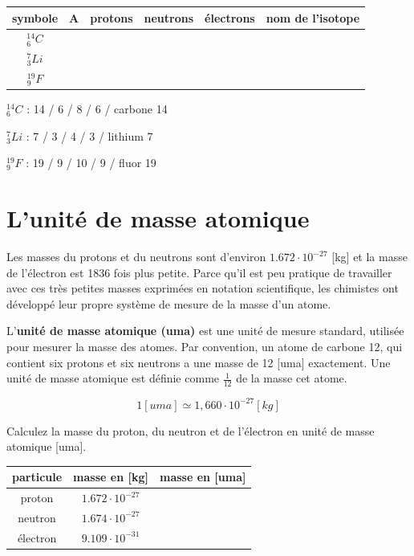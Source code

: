 \documentclass[
  11pt,
  french,
  a4paper,
  openany]{book}
\begin{document}
\begin{longtable}[]{@{}cccccc@{}}
\toprule
symbole & A & protons & neutrons & électrons & nom de l'isotope\tabularnewline
\midrule
\endhead
\(_{6}^{14}C\) & & & & &\tabularnewline
\(_{3}^{7}Li\) & & & & &\tabularnewline
\(_{9}^{19}F\) & & & & &\tabularnewline
\bottomrule
\end{longtable}

\begin{Answer}
\(_{6}^{14}C\) : 14 / 6 / 8 / 6 / carbone 14

\(_{3}^{7}Li\) : 7 / 3 / 4 / 3 / lithium 7

\(_{9}^{19}F\) : 19 / 9 / 10 / 9 / fluor 19

\end{Answer}

\hypertarget{lunituxe9-de-masse-atomique}{%
\section{L'unité de masse atomique}\label{lunituxe9-de-masse-atomique}}

Les masses du protons et du neutrons sont d'environ \(1.672\cdot10^{-27}\) {[}kg{]} et la masse de l'électron est 1836 fois plus petite. Parce qu'il est peu pratique de travailler avec ces très petites masses exprimées en notation scientifique, les chimistes ont développé leur propre système de mesure de la masse d'un atome.

L'\textbf{unité de masse atomique (uma)} est une unité de mesure standard, utilisée pour mesurer la masse des atomes. Par convention, un atome de carbone 12, qui contient six protons et six neutrons a une masse de 12 {[}uma{]} exactement. Une unité de masse atomique est définie comme \(\frac{1}{12}\) de la masse cet atome.

\[ 1 [uma] \simeq 1,660 \cdot 10^{-27} [kg] \]

\begin{Exercise}
Calculez la masse du proton, du neutron et de l'électron en unité de masse atomique {[}uma{]}.

\end{Exercise}

\begin{longtable}[]{@{}ccc@{}}
\toprule
particule & masse en {[}kg{]} & masse en {[}uma{]}\tabularnewline
\midrule
\endhead
proton & \(1.672\cdot10^{-27}\) &\tabularnewline
neutron & \(1.674\cdot10^{-27}\) &\tabularnewline
électron & \(9.109\cdot10^{-31}\) &\tabularnewline
\bottomrule
\end{longtable}
\end{document}
